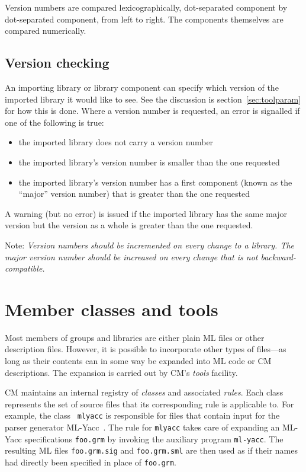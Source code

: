 \documentclass[titlepage,letterpaper]{article}
\begin{document}
Version numbers are compared lexicographically, dot-separated
component by dot-separated component, from left to right.  The
components themselves are compared numerically.

\subsection{Version checking}

An importing library or library component can specify which version of
the imported library it would like to see.  See the discussion is
section~\ref{sec:toolparam} for how this is done.  Where a version
number is requested, an error is signalled if one of the following is
true:

\begin{itemize}
\item the imported library does not carry a version number
\item the imported library's version number is smaller than the
one requested
\item the imported library's version number has a first component
(known as the ``major'' version number) that is greater than the one
requested
\end{itemize}

A warning (but no error) is issued if the imported library has the
same major version but the version as a whole is greater than the one
requested.

Note: {\it Version numbers should be incremented on every change to a
library.  The major version number should be increased on every change
that is not backward-compatible.}

\section{Member classes and tools}
\label{sec:classes}

Most members of groups and libraries are either plain ML files or
other description files.  However, it is possible to incorporate other
types of files---as long as their contents can in some way be expanded
into ML code or CM descriptions.  The expansion is carried out by CM's
{\it tools} facility.

CM maintains an internal registry of {\em classes} and associated {\em
rules}.  Each class represents the set of source files that its
corresponding rule is applicable to.  For example, the class {\tt
mlyacc} is responsible for files that contain input for the parser
generator ML-Yacc~\cite{tarditi90:yacc}.  The rule for {\tt mlyacc}
takes care of expanding an ML-Yacc specifications {\tt foo.grm} by
invoking the auxiliary program {\tt ml-yacc}.  The resulting ML files
{\tt foo.grm.sig} and {\tt foo.grm.sml} are then used as if their
names had directly been specified in place of {\tt foo.grm}.
\end{document}
